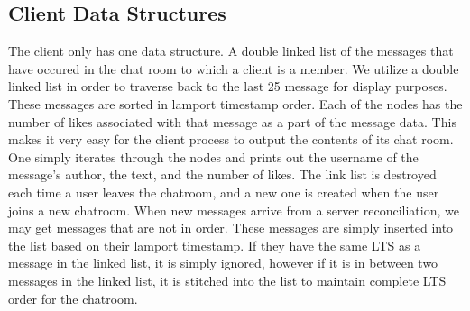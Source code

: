 \documentclass[12pt,journal,compsoc]{IEEEtran}
\begin{document}
\subsection{Client Data Structures}
The client only has one data structure. A double linked list of the messages that have occured in the chat room to which a client is a member. We utilize a double linked list in order to traverse back to the last 25 message for display purposes.  These messages are sorted in lamport timestamp order. Each of the nodes has the number of likes associated with that message as a part of the message data. This makes it very easy for the client process to output the contents of its chat room. One simply iterates through the nodes and prints out the username of the message's author, the text, and the number of likes.  The link list is destroyed each time a user leaves the chatroom, and a new one is created when the user joins a new chatroom. When new messages arrive from a server reconciliation, we may get messages that are not in order.  These messages are simply inserted into the list based on their lamport timestamp.  If they have the same LTS as a message in the linked list, it is simply ignored, however if it is in between two messages in the linked list, it is stitched into the list to maintain complete LTS order for the chatroom. 
\end{document}
